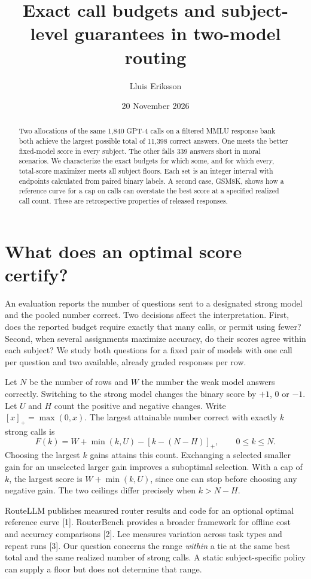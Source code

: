 \documentclass[11pt]{article}
\title{Exact call budgets and subject-level guarantees in two-model routing}
\author{Lluis Eriksson}
\date{20 November 2026}
\newcommand{\pos}[1]{[#1]_+}
\begin{document}
\maketitle
\begin{abstract}
Two allocations of the same 1,840 GPT-4 calls on a filtered MMLU response bank both achieve the largest possible total of 11,398 correct answers. One meets the better fixed-model score in every subject. The other falls 339 answers short in moral scenarios. We characterize the exact budgets for which some, and for which every, total-score maximizer meets all subject floors. Each set is an integer interval with endpoints calculated from paired binary labels. A second case, GSM8K, shows how a reference curve for a cap on calls can overstate the best score at a specified realized call count. These are retrospective properties of released responses.
\end{abstract}

\section{What does an optimal score certify?}
An evaluation reports the number of questions sent to a designated strong model and the pooled number correct. Two decisions affect the interpretation. First, does the reported budget require exactly that many calls, or permit using fewer? Second, when several assignments maximize accuracy, do their scores agree within each subject? We study both questions for a fixed pair of models with one call per question and two available, already graded responses per row.

Let $N$ be the number of rows and $W$ the number the weak model answers correctly. Switching to the strong model changes the binary score by $+1$, $0$ or $-1$. Let $U$ and $H$ count the positive and negative changes. Write $\pos{x}=\max(0,x)$. The largest attainable number correct with exactly $k$ strong calls is
\[
 F(k)=W+\min(k,U)-\pos{k-(N-H)},\qquad 0\le k\le N .
\]
Choosing the largest $k$ gains attains this count. Exchanging a selected smaller gain for an unselected larger gain improves a suboptimal selection. With a cap of $k$, the largest score is $W+\min(k,U)$, since one can stop before choosing any negative gain. The two ceilings differ precisely when $k>N-H$.

RouteLLM publishes measured router results and code for an optional optimal reference curve [1]. RouterBench provides a broader framework for offline cost and accuracy comparisons [2]. Lee measures variation across task types and repeat runs [3]. Our question concerns the range \emph{within} a tie at the same best total and the same realized number of strong calls. A static subject-specific policy can supply a floor but does not determine that range.
\end{document}
